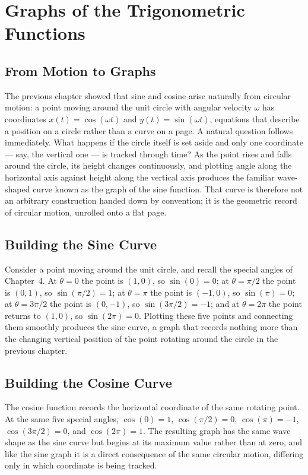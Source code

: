 \chapter{Graphs of the Trigonometric Functions}
\label{ch:ch06-graphs}

\section{From Motion to Graphs}

The previous chapter showed that sine and cosine arise naturally from
circular motion: a point moving around the unit circle with angular
velocity $\omega$ has coordinates $x(t) = \cos(\omega t)$ and $y(t) =
\sin(\omega t)$, equations that describe a position on a circle rather than
a curve on a page. A natural question follows immediately. What happens if
the circle itself is set aside and only one coordinate --- say, the
vertical one --- is tracked through time? As the point rises and falls
around the circle, its height changes continuously, and plotting angle
along the horizontal axis against height along the vertical axis produces
the familiar wave-shaped curve known as the graph of the sine function.
That curve is therefore not an arbitrary construction handed down by
convention; it is the geometric record of circular motion, unrolled onto a
flat page.

\section{Building the Sine Curve}

Consider a point moving around the unit circle, and recall the special
angles of Chapter~4. At $\theta = 0$ the point is $(1,0)$, so $\sin(0) = 0$;
at $\theta = \pi/2$ the point is $(0,1)$, so $\sin(\pi/2) = 1$; at $\theta =
\pi$ the point is $(-1,0)$, so $\sin(\pi) = 0$; at $\theta = 3\pi/2$ the
point is $(0,-1)$, so $\sin(3\pi/2) = -1$; and at $\theta = 2\pi$ the point
returns to $(1,0)$, so $\sin(2\pi) = 0$. Plotting these five points and
connecting them smoothly produces the sine curve, a graph that records
nothing more than the changing vertical position of the point rotating
around the circle in the previous chapter.

\section{Building the Cosine Curve}

The cosine function records the horizontal coordinate of the same rotating
point. At the same five special angles, $\cos(0) = 1$, $\cos(\pi/2) = 0$,
$\cos(\pi) = -1$, $\cos(3\pi/2) = 0$, and $\cos(2\pi) = 1$. The resulting
graph has the same wave shape as the sine curve but begins at its maximum
value rather than at zero, and like the sine graph it is a direct
consequence of the same circular motion, differing only in which coordinate
is being tracked.

